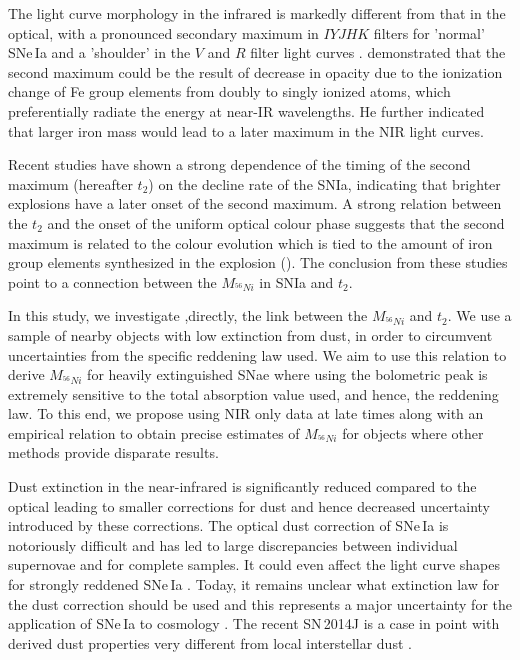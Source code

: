 \documentclass{aa}
\begin{document}
The light curve morphology in the infrared is markedly different from
that in the optical, with a pronounced secondary maximum in $IYJHK$
filters for 'normal' SNe\,Ia and a 'shoulder' in the $V$ and $R$ filter
light curves \citep{Elias1983, Leibundgut1988, Leibundgut2000,
Meikle2000, WV08, Folatelli2010}. \cite{Kasen2006} demonstrated that the
second maximum could be the result of decrease in opacity due to the
ionization change of Fe group elements from doubly to singly ionized
atoms, which preferentially radiate the energy at near-IR wavelengths.
He further indicated that larger iron mass would lead to a later maximum
in the NIR light curves.

Recent studies have shown a strong dependence of the timing of the second maximum (hereafter $t_2$)
on the decline rate of the SNIa, indicating that brighter explosions have a later onset of the second maximum. A strong relation
between the $t_2$ and the onset of the uniform optical colour phase \citep[hereafter $t_L$, see also $t_{max}$][]{Burns2014} suggests that the second maximum is related to the colour evolution
which is tied to the amount of iron group elements synthesized in the explosion (\cite{Kasen2007}). The conclusion from these studies point to a connection between 
the $M_{^{56}Ni}$ in SNIa and $t_2$. 

In this study, we investigate ,directly, the link between the  $M_{^{56}Ni}$ and $t_2$. We use a sample of nearby objects with low extinction from dust, in order to circumvent uncertainties
from the specific reddening law used. We aim to use this relation to derive $M_{^{56}Ni}$ for heavily extinguished SNae where using the bolometric peak is extremely sensitive to the 
total absorption value used, and hence, the reddening law. To this end, we propose using NIR only data at late times along with an empirical relation to obtain precise 
estimates of $M_{^{56}Ni}$ for objects where other methods provide disparate results. 


\iffalse
Dust extinction in the near-infrared is significantly reduced compared
to the optical leading to smaller corrections for dust and hence
decreased uncertainty introduced by these corrections. The optical dust
correction of SNe\,Ia is notoriously difficult and has led to large
discrepancies between individual supernovae and for complete samples. It
could even affect the light curve shapes for strongly reddened SNe\,Ia
\citep{Leibundgut1988, Amanullah2014}. Today, it remains unclear what
extinction law for the dust correction should be used \citep[see discussions in][]{Phillips2013, Scolnic2014} 
and this represents a major
uncertainty for the application of SNe\,Ia to cosmology
\citep[eg.][]{Peacock2006, Goobar2011}. The recent SN\,2014J is a case in
point with derived dust properties very different from local
interstellar dust \citep{Amanullah2014, Foley2014}. 
\end{document}
